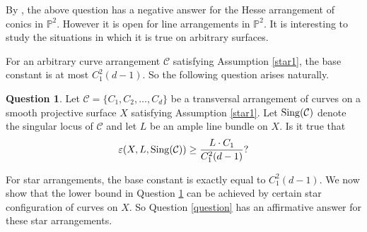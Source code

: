 \documentclass[12pt,reqno]{amsart}
\theoremstyle{plain}
\numberwithin{equation}{section}
\theoremstyle{definition}
\newtheorem{question}[theorem]{Question}
\begin{document}
By \cite[Example 3.5]{JP}, the above question has a negative answer for the Hesse arrangement of conics 
in $\mathbb{P}^2$. However it is open for line arrangements in $\mathbb{P}^2$. 
It is interesting to study the situations in which it is true on arbitrary surfaces. 


For an arbitrary curve arrangement $\mathcal{C}$ satisfying Assumption \ref{star1}, the base constant is at most 
$C_1^2(d-1)$. So the following question arises naturally. 

	\begin{question}\label{QuestM}
		Let $\mathcal{C} =\{C_1,C_2, \ldots ,C_d\}$ be a transversal arrangement of curves on a smooth projective surface $X$
		satisfying Assumption \ref{star1}. Let  ${\rm Sing}(\mathcal{C})$ denote the singular locus of $\mathcal{C}$ and let $L$ be an ample line bundle on $X$. Is it true that
		\begin{equation}\label{ques}
			\varepsilon(X, L,{\rm Sing}(\mathcal{C})) \geq \frac{L \cdot C_1}{C_1^2(d-1)} ?	
		\end{equation}	
		
	\end{question}	
	
	For star arrangements, the base constant is exactly equal to $C_1^2(d-1)$.
	We now show that the lower bound in Question \ref{QuestM} can be achieved by certain star configuration of curves on $X.$	So Question \ref{question} has an affirmative answer for these star arrangements. 
	
\end{document}

